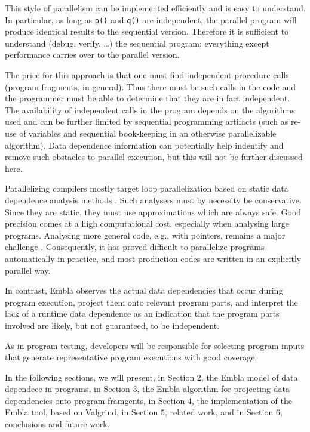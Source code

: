 This style of parallelism can be implemented efficiently and is easy
to understand.  In particular, as long as {\tt p()} and {\tt q()} are
independent, the parallel program will produce identical results to
the sequential version.  Therefore it is sufficient to understand
(debug, verify, \ldots) the sequential program; everything except
performance carries over to the parallel version.

The price for this approach is that one must find independent
procedure calls (program fragments, in general).  Thus there must be
such calls in the code and the programmer must be able to determine
that they are in fact independent.  The availability of independent
calls in the program depends on the algorithms used and can be further
limited by sequential programming artifacts (such as re-use of
variables and sequential book-keeping in an otherwise parallelizable
algorithm).  Data dependence information can potentially help
indentify and remove such obstacles to parallel execution, but this
will not be further discussed here.

Parallelizing compilers mostly target loop parallelization based on
static data dependence analysis methods \cite{}.  Such analysers must
by necessity be conservative.  Since they are static, they must use
approximations which are always safe.  Good precision comes at a high
computational cost, especially when analysing large programs.
Analysing more general code, e.g., with pointers, remains a major
challenge \cite{}.  Consequently, it has proved difficult to
parallelize programs automatically in practice, and most production
codes are written in an explicitly parallel way.

In contrast, Embla
observes the actual data dependencies that occur during program
execution, project them onto relevant program parts, and interpret the
lack of a runtime data dependence as an indication that the program
parts involved are likely, but not guaranteed, to be independent.


As in program testing, developers will be responsible for selecting
program inputs that generate representative program executions with
good coverage.

In the following sections, we will present, in Section 2, the Embla
model of data dependece in programs, in Section 3, the Embla algorithm
for projecting data dependencies onto program framgents, in Section 4,
the implementation of the Embla tool, based on Valgrind, in Section 5,
related work, and in Section 6, conclusions and future work.
